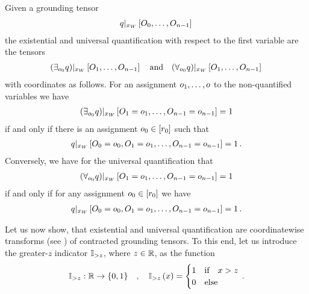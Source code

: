 \begin{definition}
    Given a grounding tensor
    \begin{align*}
        {q}|_{x_{W}} \left[O_{0},\ldots,O_{n-1}\right] \,
    \end{align*}
    the existential and universal quantification with respect to the first variable are the tensors
    \begin{align*}
        {\left(\exists_{o_{0}}q\right)}|_{x_{W}} \left[O_{1},\ldots,O_{n-1}\right] \quad\text{and}\quad
        {\left(\forall_{o_{0}}q\right)}|_{x_{W}} \left[O_{1},\ldots,O_{n-1}\right] \,
    \end{align*}
    with coordinates as follows.
    For an assignment $o_{1},\ldots,o$ to the non-quantified variables we have
    \begin{align*}
        {\left(\exists_{o_{0}}q\right)}|_{x_{W}} \left[O_{1}=o_{1},\ldots,O_{n-1}=o_{n-1}\right] = 1
    \end{align*}
    if and only if there is an assignment $o_{0}\in[r_{0}]$ such that
    \begin{align*}
        {q}|_{x_{W}} \left[O_{0}=o_{0},O_{1}=o_{1},\ldots,O_{n-1}=o_{n-1}\right] = 1 \, .
    \end{align*}
    Conversely, we have for the universal quantification that
    \begin{align*}
        {\left(\forall_{o_{0}}q\right)}|_{x_{W}} \left[O_{1}=o_{1},\ldots,O_{n-1}=o_{n-1}\right] = 1
    \end{align*}
    if and only if for any assignment $o_{0}\in[r_{0}]$ we have
    \begin{align*}
        {q}|_{x_{W}} \left[O_{0}=o_{0},O_{1}=o_{1},\ldots,O_{n-1}=o_{n-1}\right] = 1 \, .
    \end{align*}
\end{definition}


Let us now show, that existential and universal quantification are coordinatewise transforms (see ) of contracted grounding tensors.
To this end, let us introduce the greater-$z$ indicator $\mathbb{I}_{>z}$, where $z\in\mathbb{R}$, as the function
\begin{align*}
    \mathbb{I}_{>z} : \mathbb{R} \rightarrow \{0,1\}
    \quad, \quad \mathbb{I}_{>z}\left(x\right) =
    \begin{cases}
        1 & \text{if}\quad x > z\\
        0 & \text{else}
    \end{cases} \, .
\end{align*}

